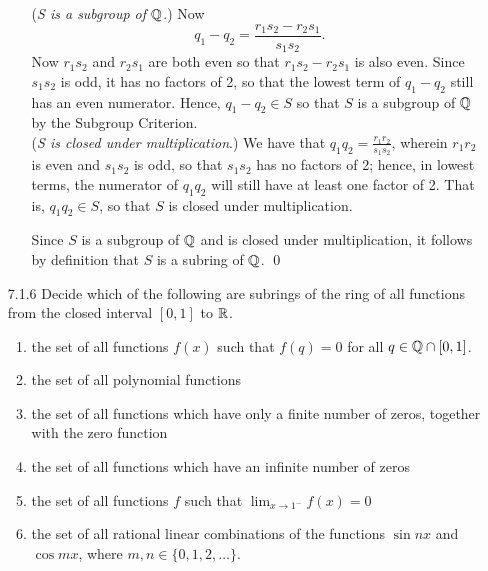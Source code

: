 \begin{enumerate}
\begin{enumerate}
               (\textit{S is a subgroup of $\mathbb{Q}$}.) Now
               $$q_1 - q_2 = \frac{r_1s_2 - r_2s_1}{s_1s_2}.$$
               Now $r_1s_2$ and $r_2s_1$ are both even so that $r_1s_2 - r_2s_1$
               is also even. Since $s_1s_2$ is odd, it has no factors of 2, so
               that the lowest term of $q_1 - q_2$ still has an even numerator.
               Hence, $q_1 - q_2 \in S$ so that $S$ is a subgroup of $\mathbb{Q}$ by the
               Subgroup Criterion. \\

               (\textit{S is closed under multiplication}.) We have that
               $q_1q_2 = \frac{r_1r_2}{s_1s_2}$, wherein $r_1r_2$ is even and
               $s_1s_2$ is odd, so that $s_1s_2$ has no factors of 2; hence, in
               lowest terms, the numerator of $q_1q_2$ will still have at least
               one factor of 2. That is, $q_1q_2 \in S$, so that $S$ is closed
               under multiplication.
            
               Since $S$ is a subgroup of $\mathbb{Q}$ and is closed under
               multiplication, it follows by definition that $S$ is a subring of 
               $\mathbb{Q}$. \qed
      \end{enumerate}
   \item[7.1.6]   Decide which of the following are subrings of the ring of all
                  functions from the closed interval $[0,1]$ to $\mathbb{R}$.
                  \begin{enumerate}
                     \item the set of all functions $f(x)$ such that $f(q) = 0$
                           for all $q \in \mathbb{Q} \cap [0, 1]$.
                     \item the set of all polynomial functions
                     \item the set of all functions which have only a finite
                           number of zeros, together with the zero function
                     \item the set of all functions which have an infinite
                           number of zeros
                     \item the set of all functions $f$ such that
                           $\lim_{x\rightarrow1^-}f(x) = 0$
                     \item the set of all rational linear combinations of the
                           functions $\sin nx$ and $\cos mx$, where
                           $m, n \in \{0, 1, 2, \ldots \}$.
                  \end{enumerate}


\end{enumerate}
